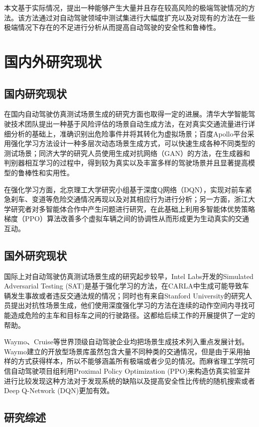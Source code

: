 本文基于实际情况，提出一种能够产生大量并且存在较高风险的极端驾驶情况的方法。该方法通过对自动驾驶领域中测试集进行大幅度扩充以及对现有的方法在一些极端情况下存在的不足进行分析从而提高自动驾驶的安全性和鲁棒性。

\section{国内外研究现状}
\subsection{国内研究现状}

在国内自动驾驶仿真测试场景生成的研究方面也取得一定的进展。清华大学智能驾驶技术团队提出一种基于风险评估的场景自动生成方法，在对真实交通流量进行详细分析的基础上，准确识别出危险事件并将其转化为虚拟场景；百度Apollo平台采用强化学习方法设计一种多层次动态场景生成方式，可以快速生成各种不同类型的测试场景；同济大学的研究人员使用生成对抗网络（GAN）的方法，在生成器和判别器相互学习的过程中，得到较为真实以及丰富多样的驾驶场景并且显著提高模型的鲁棒性和实用性。

在强化学习方面，北京理工大学研究小组基于深度Q网络（DQN），实现对前车紧急刹车、变道等危险交通情况再现以及对其相应行为进行分析；另一方面，浙江大学研究者对多智能体合作中产生问题进行研究，在此基础上利用多智能体优势策略梯度（PPO）算法改善多个虚拟车辆之间的协调性从而形成更为生动真实的交通互动\cite{zhou2026autonomous}。

\subsection{国外研究现状}

国际上对自动驾驶仿真测试场景生成的研究起步较早，Intel Labs开发的Simulated Adversarial Testing (SAT)是基于强化学习的方法，在CARLA中生成可能导致车辆发生事故或者违反交通法规的情况；同时也有来自Stanford University的研究人员提出对抗性场景生成，他们使用深度强化学习的方法在连续的动作空间内寻找可能造成危险的主车和目标车之间的行驶路径。这都给后续工作的开展提供了一定的帮助。

Waymo、Cruise等世界顶级自动驾驶企业均把场景生成技术列入重点发展计划。Waymo建立的开放型场景库虽然包含大量不同种类的交通情况，但是由于采用抽样的方式获得样本，所以不能够涵盖所有极端或者少见的情况。而麻省理工学院可信自动驾驶项目组利用Proximal Policy Optimization (PPO)来构造仿真实验室并进行比较发现这种方法对于发现系统的缺陷以及提高安全性比传统的随机搜索或者Deep Q-Network (DQN)更加有效\cite{guo2026spatial}。
\subsection{研究综述}

